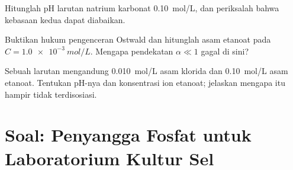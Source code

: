 \begin{exercise}[$\star\star\star$]\label{exo:b1:predominant-reaction:10}
Hitunglah pH larutan natrium karbonat \qty{0.10}{mol/L}, dan periksalah
bahwa kebasaan kedua dapat diabaikan.
\end{exercise}

\begin{exercise}[$\star\star\star$]\label{exo:b1:predominant-reaction:11}
Buktikan hukum pengenceran Ostwald dan hitunglah  asam
etanoat pada $C = \qty{1.0e-3}{mol/L}$. Mengapa pendekatan
$\alpha \ll 1$ gagal di sini?
\end{exercise}

\begin{exercise}[$\star\star\star$]\label{exo:b1:predominant-reaction:12}
Sebuah larutan mengandung \qty{0.010}{mol/L} asam klorida dan
\qty{0.10}{mol/L} asam etanoat. Tentukan pH-nya dan konsentrasi ion
etanoat; jelaskan mengapa  itu hampir tidak terdisosiasi.
\end{exercise}

\section{Soal: Penyangga Fosfat untuk Laboratorium Kultur Sel}

